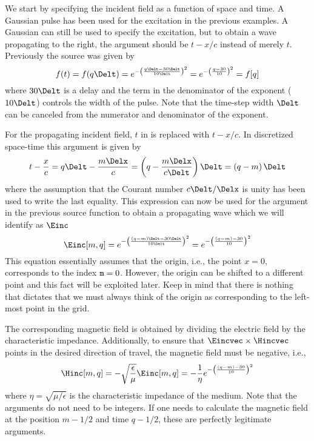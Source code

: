 We start by specifying the incident field as a function of space and
time.  A Gaussian pulse has been used for the excitation in the
previous examples.  A Gaussian can still be used to specify the
excitation, but to obtain a wave propagating to the right, the
argument should be $t-x/c$ instead of merely $t$.  Previously the
source was given by
\begin{equation}
  f(t) = f(q\Delt)
       = e^{-\left(\frac{q\Delt - 30 \Delt}{10 \Delt}\right)^2} =
         e^{-\left(\frac{q - 30}{10}\right)^2} = f[q]
  \label{eq:sourceFunc}
\end{equation}
where $30\Delt$ is a delay and the term in the denominator of the
exponent ($10 \Delt$) controls the width of the pulse.  Note that the
time-step width $\Delt$ can be canceled from the numerator and
denominator of the exponent.

For the propagating incident field, $t$ in  is
replaced with $t-x/c$.  In discretized space-time this argument is
given by
\begin{equation}
  t-\frac{x}{c} = q\Delt-\frac{m\Delx}{c} =
  \left(q-\frac{m\Delx}{c\Delt}\right)\Delt
  = \left(q-m\right)\Delt
\end{equation}
where the assumption that the Courant number $c\Delt/\Delx$ is unity
has been used to write the last equality.  This expression can now be
used for the argument in the previous source function to obtain a
propagating wave which we will identify as $\Einc$
\begin{equation}
  \Einc[m,q]
       = e^{-\left(\frac{(q-m)\Delt - 30 \Delt}{10 \Delt}\right)^2}
       = e^{-\left(\frac{(q-m) - 30}{10}\right)^2}
\end{equation}
This equation essentially assumes that the origin, i.e., the point
$x=0$, corresponds to the index ${\mbox{\tt m}}=0$.  However, the
origin can be shifted to a different point and this fact will be
exploited later.  Keep in mind that there is nothing that dictates
that we must always think of the origin as corresponding to the
left-most point in the grid.

The corresponding magnetic field is obtained by dividing the electric
field by the characteristic impedance.  Additionally, to ensure that
$\Eincvec\times\Hincvec$ points in the desired direction of travel,
the magnetic field must be negative, i.e.,
\begin{equation}
  \Hinc[m,q] = -\sqrt{\frac{\epsilon}{\mu}}\Einc[m,q]
             = -\frac{1}{\eta}
                 e^{-\left(\frac{(q-m) - 30}{10}\right)^2}
\end{equation}
where $\eta=\sqrt{\mu/\epsilon}$ is the characteristic impedance of the
medium.  Note that the arguments do not need to be integers.  If one
needs to calculate the magnetic field at the position $m-1/2$ and time
$q-1/2$, these are perfectly legitimate arguments.

